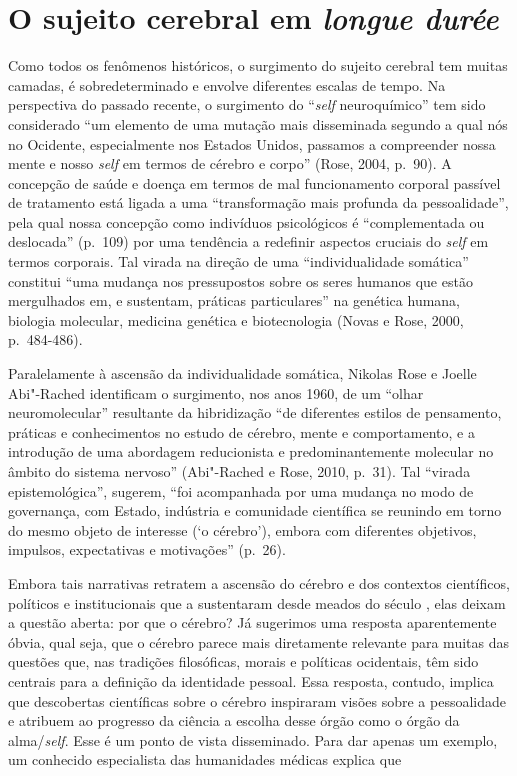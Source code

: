 \section{O sujeito cerebral em \emph{longue durée}}

Como todos os fenômenos históricos, o surgimento do sujeito cerebral tem
muitas camadas, é sobredeterminado e envolve diferentes escalas de
tempo. Na perspectiva do passado recente, o surgimento do ``\emph{self}
neuroquímico'' tem sido considerado ``um elemento de uma mutação mais
disseminada segundo a qual nós no Ocidente, especialmente nos Estados
Unidos, passamos a compreender nossa mente e nosso \emph{self} em termos de
cérebro e corpo'' (Rose, 2004, p.~90). A concepção de saúde e doença em
termos de mal funcionamento corporal passível de tratamento está ligada
a uma ``transformação mais profunda da pessoalidade'', pela qual nossa
concepção como indivíduos psicológicos é ``complementada ou deslocada''
(p.~109) por uma tendência a redefinir aspectos cruciais do \emph{self} em
termos corporais. Tal virada na direção de uma ``individualidade
somática'' constitui ``uma mudança nos pressupostos sobre os seres
humanos que estão mergulhados em, e sustentam, práticas particulares''
na genética humana, biologia molecular, medicina genética e
biotecnologia (Novas e Rose, 2000, p.~484-486).

Paralelamente à ascensão da individualidade somática, Nikolas Rose e
Joelle Abi"-Rached identificam o surgimento, nos anos 1960, de um ``olhar
neuromolecular'' resultante da hibridização ``de diferentes estilos de
pensamento, práticas e conhecimentos no estudo de cérebro, mente e
comportamento, e a introdução de uma abordagem reducionista e
predominantemente molecular no âmbito do sistema nervoso'' (Abi"-Rached e
Rose, 2010, p.~31). Tal ``virada epistemológica'', sugerem, ``foi
acompanhada por uma mudança no modo de governança, com Estado, indústria
e comunidade científica se reunindo em torno do mesmo objeto de
interesse (`o cérebro'), embora com diferentes objetivos, impulsos,
expectativas e motivações'' (p.~26).

Embora tais narrativas retratem a ascensão do cérebro e dos contextos
científicos, políticos e institucionais que a sustentaram desde meados
do século , elas deixam a questão aberta: por que o cérebro? Já
sugerimos uma resposta aparentemente óbvia, qual seja, que o cérebro
parece mais diretamente relevante para muitas das questões que, nas
tradições filosóficas, morais e políticas ocidentais, têm sido centrais
para a definição da identidade pessoal. Essa resposta, contudo, implica
que descobertas científicas sobre o cérebro inspiraram visões sobre a
pessoalidade e atribuem ao progresso da ciência a escolha desse órgão
como o órgão da alma/\emph{self}. Esse é um ponto de vista disseminado. Para
dar apenas um exemplo, um conhecido especialista das humanidades médicas
explica que

